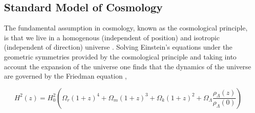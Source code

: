 
\subsection{Standard Model of Cosmology}

The fundamental assumption in cosmology, known as the cosmological principle, is that we live in a homogenous (independent of position) and isotropic (independent of direction) universe \cite{general_2013,ryden}. Solving Einstein's equations under the geometric symmetries provided by the cosmological principle and taking into account the expansion of the universe one finds that the dynamics of the universe are governed by the Friedman equation \cite{ryden,general_2013},

\begin{equation}
  H^2(z) = H_0^2 \left(\Omega_r (1+z)^4 + \Omega_m (1+z)^3 + \Omega_k (1+z)^2 + \Omega_\Lambda \frac{\rho_\Lambda(z)}{\rho_\Lambda(0)}\right)
  \label{eq:friedman}
\end{equation}

